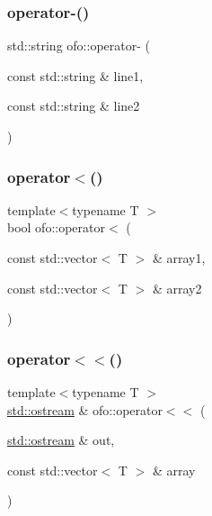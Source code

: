 \mbox{\label{namespaceofo_ab410ed9a84e65ca88a937b56b8411a97}} 
\subsubsection{\texorpdfstring{operator-\/()}{operator-()}\hspace{0.1cm}{\footnotesize\ttfamily [2/2]}}
{\footnotesize\ttfamily std\+::string ofo\+::operator-\/ (\begin{DoxyParamCaption}\item[{const std\+::string \&}]{line1,  }\item[{const std\+::string \&}]{line2 }\end{DoxyParamCaption})}

\mbox{\label{namespaceofo_a3a9f0e591617562dc29964c77510abf1}} 
\subsubsection{\texorpdfstring{operator$<$()}{operator<()}}
{\footnotesize\ttfamily template$<$typename T $>$ \\
bool ofo\+::operator$<$ (\begin{DoxyParamCaption}\item[{const std\+::vector$<$ T $>$ \&}]{array1,  }\item[{const std\+::vector$<$ T $>$ \&}]{array2 }\end{DoxyParamCaption})}

\mbox{\label{namespaceofo_ac3a7d5d99908e98ee6b8c1808805ee20}} 
\subsubsection{\texorpdfstring{operator$<$$<$()}{operator<<()}}
{\footnotesize\ttfamily template$<$typename T $>$ \\
\mbox{\hyperlink{doctest_8h_a116af65cb5e924b33ad9d9ecd7a783f3}{std\+::ostream}} \& ofo\+::operator$<$$<$ (\begin{DoxyParamCaption}\item[{\mbox{\hyperlink{doctest_8h_a116af65cb5e924b33ad9d9ecd7a783f3}{std\+::ostream}} \&}]{out,  }\item[{const std\+::vector$<$ T $>$ \&}]{array }\end{DoxyParamCaption})}

